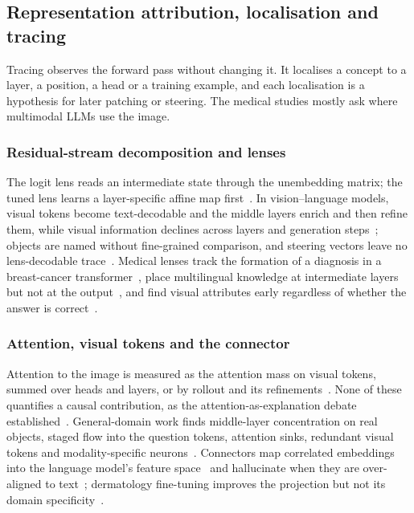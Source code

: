 \subsection{Representation attribution, localisation and tracing}
\label{sec:tracing}

Tracing observes the forward pass without changing it. It localises a concept to a layer, a position, a
head or a training example, and each localisation is a hypothesis for later patching or steering. The
medical studies mostly ask where multimodal LLMs use the image.

\subsubsection{Residual-stream decomposition and lenses}

The logit lens reads an intermediate state through the unembedding matrix; the tuned lens learns a
layer-specific affine map first~\cite{belrose2023eliciting}. In vision--language models, visual tokens
become text-decodable and the middle layers enrich and then refine them, while visual information
declines across layers and generation steps~\cite{neo2024towards,jiang2024devils,li2025the}; objects are
named without fine-grained comparison, and steering vectors leave no lens-decodable
trace~\cite{shahgir2026vlms,nadaf2026steerable}. Medical lenses track the formation of a diagnosis in a
breast-cancer transformer~\cite{takahashi2026vision}, place multilingual knowledge at intermediate
layers but not at the output~\cite{abouzahir2026bridging}, and find visual attributes early regardless of
whether the answer is correct~\cite{nooralahzadeh2026arbitration}.

\subsubsection{Attention, visual tokens and the connector}

Attention to the image is measured as the attention mass on visual tokens, summed over heads and
layers, or by rollout and its refinements~\cite{abnar2020quantifying,chefer2021transformer}. None of these
quantifies a causal contribution, as the attention-as-explanation debate
established~\cite{jain2019attention,wiegreffe2019attention,serrano2019is}. General-domain work finds
middle-layer concentration on real objects, staged flow into the question tokens, attention sinks,
redundant visual tokens and modality-specific
neurons~\cite{jiang2024devils,zhang2024cross,kang2025you,luo2025sink,chen2024image,wang2025token,huo2024mmneuron,huang2024miner,kang2025large,kim2025interpreting,jiang2025investigating}.
Connectors map correlated embeddings into the language model's feature
space~\cite{lee2026more,venhoff2025visual} and hallucinate when they are over-aligned to
text~\cite{fan2026visual,venhoff2025too,saini2026when}; dermatology fine-tuning improves the projection
but not its domain specificity~\cite{verma2024cross}.

